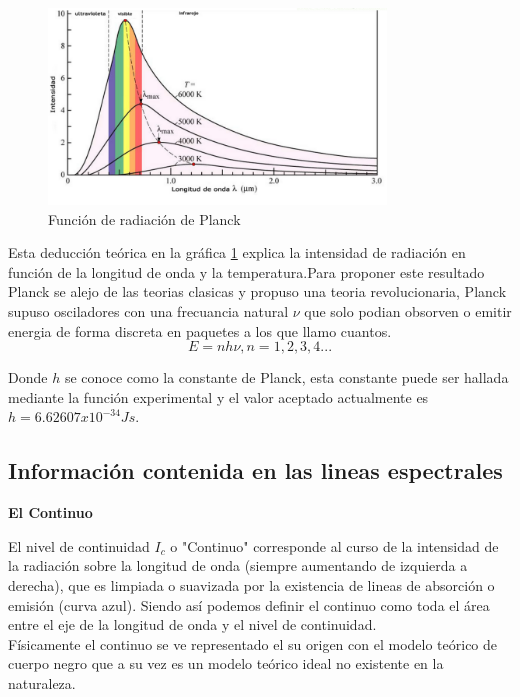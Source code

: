 \begin{figure}[htb!]
\centering
\includegraphics[width=0.8\textwidth]{images/6.png}
\caption[Descripción versión comprimida]{Función de radiación de Planck\cite{gra6}}
 \label{fig2}
\end{figure}




\noindent Esta deducción teórica en la gráfica \ref{fig2} explica la intensidad de radiación en función de la longitud de onda y la temperatura.Para proponer este resultado Planck se alejo de las teorias clasicas y propuso una teoria revolucionaria, Planck supuso osciladores con una frecuancia natural $\nu$ que solo podian obsorven o emitir energia de forma discreta en paquetes a los que llamo cuantos.
\begin{equation}
    E= nh\nu , n=1,2,3,4...
\end{equation}{}

\noindent Donde $h$ se conoce como la constante de Planck, esta constante puede ser hallada mediante la función experimental y el valor aceptado actualmente es $h=6.62607x10^{-34} Js$.



\subsection {Información contenida en las lineas espectrales}
\noindent \textbf{El Continuo}

\noindent El nivel de continuidad $I_c$ o "Continuo" corresponde al curso de la intensidad de la radiación sobre la longitud de onda (siempre aumentando de izquierda a derecha), que es limpiada o suavizada por la existencia de lineas de absorción o emisión (curva azul). Siendo así podemos definir el continuo como toda el área entre el eje de la longitud de onda y el nivel de continuidad.  \\

\noindent Físicamente el continuo se ve representado el su origen con el modelo teórico de cuerpo negro que a su vez es un modelo teórico ideal no existente en la naturaleza.

